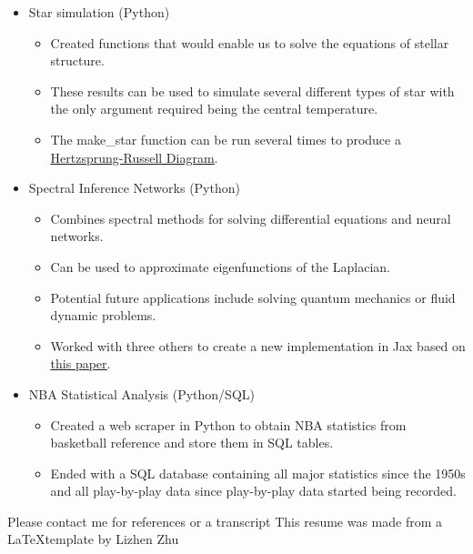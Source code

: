 \documentclass[]{cv-style}          %
\begin{document}
\begin{itemize}
    \item Star simulation (Python)
    \begin{itemize}
        \item Created functions that would enable us to solve the equations of stellar structure.
        \item These results can be used to simulate several different types of star with the only argument required being the central temperature.
        \item The make\_star function can be run several times to produce a \href{https://en.wikipedia.org/wiki/Hertzsprung\%E2\%80\%93Russell_diagram}  {\underline{ Hertzsprung-Russell Diagram}}.
    \end{itemize}
    
    \item Spectral Inference Networks (Python)
    \begin{itemize}
        \item Combines spectral methods for solving differential equations and neural networks.
        \item Can be used to approximate eigenfunctions of the Laplacian.
        \item Potential future applications include solving quantum mechanics or fluid dynamic problems.
        \item Worked with three others to create a new implementation in Jax based on \underline{\href{https://arxiv.org/pdf/1806.02215.pdf}{this paper}}.
    \end{itemize}
    
    \item NBA Statistical Analysis (Python/SQL)
    \begin{itemize}
        \item Created a web scraper in Python to obtain NBA statistics from basketball reference and store them in SQL tables.
        \item Ended with a SQL database containing all major statistics since the 1950s and all play-by-play data since play-by-play data started being recorded.
    \end{itemize}
\end{itemize}



\vspace{20pt}

Please contact me for references or a transcript \newline
This resume was made from a \LaTeX template by Lizhen Zhu
\end{document}
